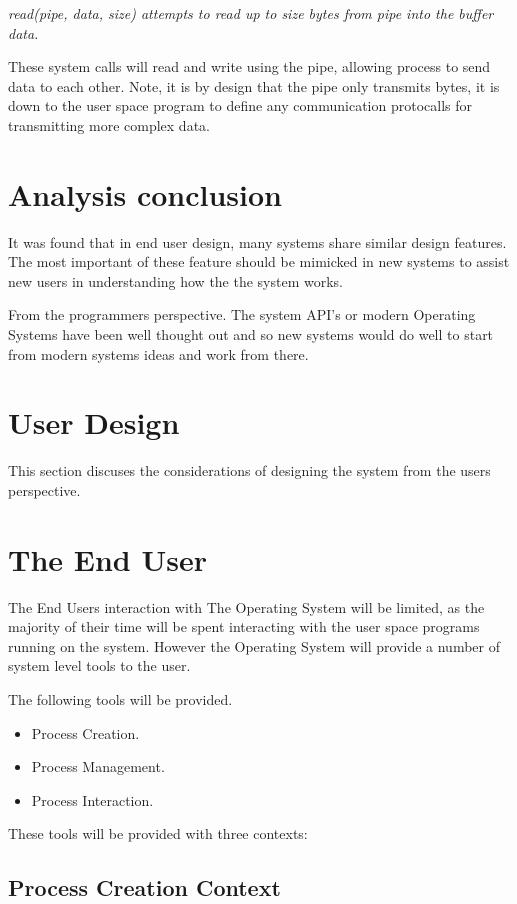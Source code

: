 \documentclass[a4paper]{report}
\begin{document}
\textit{read(pipe, data, size) attempts to read up to size bytes from pipe into the buffer data.} \cite{manRead}

These system calls will read and write using the pipe, allowing process to send data to each other. Note, it is by design that the pipe only transmits bytes, it is down to the user space program to define any communication protocalls for transmitting more complex data.

\section{Analysis conclusion}

It was found that in end user design, many systems share similar design features. The most important of these feature should be mimicked in new systems to assist new users in understanding how the the system works.

From the programmers perspective. The system API's or modern Operating Systems have been well thought out and so new systems would do well to start from modern systems ideas and work from there.


\clearpage
\section{User Design}

This section discuses the considerations of designing the system from the users perspective.

\section{The End User}

The End Users interaction with The Operating System will be limited, as the majority of their time will be spent interacting with the user space programs running on the system. However the Operating System will provide a number of system level tools to the user.

The following tools will be provided.
\begin{itemize}
\item Process Creation.
\item Process Management.
\item Process Interaction.
\end{itemize}

These tools will be provided with three contexts:

\subsection{Process Creation Context}
\end{document}
